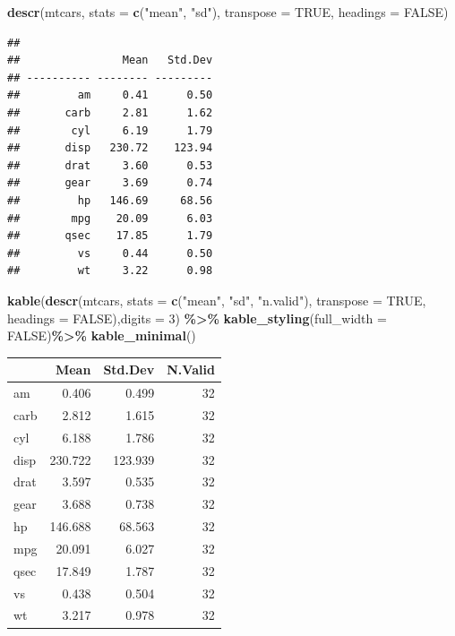 \documentclass[
]{article}
\newenvironment{Shaded}{\begin{snugshade}}{\end{snugshade}}
\newcommand{\AttributeTok}[1]{\textcolor[rgb]{0.13,0.29,0.53}{#1}}
\newcommand{\ConstantTok}[1]{\textcolor[rgb]{0.56,0.35,0.01}{#1}}
\newcommand{\DecValTok}[1]{\textcolor[rgb]{0.00,0.00,0.81}{#1}}
\newcommand{\FunctionTok}[1]{\textcolor[rgb]{0.13,0.29,0.53}{\textbf{#1}}}
\newcommand{\NormalTok}[1]{#1}
\newcommand{\SpecialCharTok}[1]{\textcolor[rgb]{0.81,0.36,0.00}{\textbf{#1}}}
\newcommand{\StringTok}[1]{\textcolor[rgb]{0.31,0.60,0.02}{#1}}
\begin{document}
\begin{Shaded}
\begin{Highlighting}[]
\FunctionTok{descr}\NormalTok{(mtcars, }\AttributeTok{stats =} \FunctionTok{c}\NormalTok{(}\StringTok{"mean"}\NormalTok{, }\StringTok{"sd"}\NormalTok{), }\AttributeTok{transpose =} \ConstantTok{TRUE}\NormalTok{, }\AttributeTok{headings =} \ConstantTok{FALSE}\NormalTok{)}
\end{Highlighting}
\end{Shaded}

\begin{verbatim}
## 
##                Mean   Std.Dev
## ---------- -------- ---------
##         am     0.41      0.50
##       carb     2.81      1.62
##        cyl     6.19      1.79
##       disp   230.72    123.94
##       drat     3.60      0.53
##       gear     3.69      0.74
##         hp   146.69     68.56
##        mpg    20.09      6.03
##       qsec    17.85      1.79
##         vs     0.44      0.50
##         wt     3.22      0.98
\end{verbatim}

\begin{Shaded}
\begin{Highlighting}[]
\FunctionTok{kable}\NormalTok{(}\FunctionTok{descr}\NormalTok{(mtcars, }\AttributeTok{stats =} \FunctionTok{c}\NormalTok{(}\StringTok{"mean"}\NormalTok{, }\StringTok{"sd"}\NormalTok{, }\StringTok{"n.valid"}\NormalTok{), }\AttributeTok{transpose =} \ConstantTok{TRUE}\NormalTok{,}
              \AttributeTok{headings =} \ConstantTok{FALSE}\NormalTok{),}\AttributeTok{digits =} \DecValTok{3}\NormalTok{) }\SpecialCharTok{\%\textgreater{}\%} 
  \FunctionTok{kable\_styling}\NormalTok{(}\AttributeTok{full\_width =} \ConstantTok{FALSE}\NormalTok{)}\SpecialCharTok{\%\textgreater{}\%} \FunctionTok{kable\_minimal}\NormalTok{()}
\end{Highlighting}
\end{Shaded}

\begin{table}
\centering
\begin{tabular}{l|r|r|r}
\hline
  & Mean & Std.Dev & N.Valid\\
\hline
am & 0.406 & 0.499 & 32\\
\hline
carb & 2.812 & 1.615 & 32\\
\hline
cyl & 6.188 & 1.786 & 32\\
\hline
disp & 230.722 & 123.939 & 32\\
\hline
drat & 3.597 & 0.535 & 32\\
\hline
gear & 3.688 & 0.738 & 32\\
\hline
hp & 146.688 & 68.563 & 32\\
\hline
mpg & 20.091 & 6.027 & 32\\
\hline
qsec & 17.849 & 1.787 & 32\\
\hline
vs & 0.438 & 0.504 & 32\\
\hline
wt & 3.217 & 0.978 & 32\\
\hline
\end{tabular}
\end{table}
\end{document}
